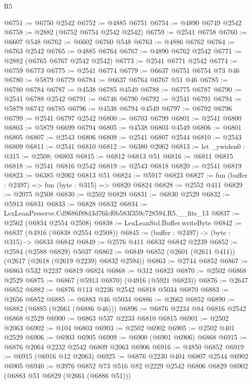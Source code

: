\begin{lexlean}{R5}
\begin{coremodule}
@6751 := @6750 @2542
@6752 := @4885 @6751
@6754 := @4890 @6749 @2542
@6758 := @2882 (@6752 @6754 @2542 @2542)
@6759 := @2541 @6758
@6760 := @6607 @548
@6762 := @6602 @6760 @548
@6763 := @4886 @6762
@6764 := @6763 @2542
@6765 := @4885 @6764
@6767 := @4890 @6762 @2542
@6771 := @2882 (@6765 @6767 @2542 @2542)
@6773 := @2541 @6771 @2542
@6774 := @6759 @6773
@6775 := @2541 @6774
@6779 := @6637 @6751 @6754 @73 @46
@6780 := @5879 @6779
@6784 := @6637 @6764 @6767 @51 @46
@6785 := @6780 @6784
@6787 := @4538 @6785 @4549
@6788 := @6775 @6787
@6790 := @2541 @6788 @2542
@6791 := @6746 @6790
@6792 := @2541 @6791
@6794 := @5879 @6742 @6785
@6796 := @4538 @6794 @4549
@6797 := @6792 @6796
@6799 := @2541 @6797 @2542
@6800 := @6703 @6799
@6801 := @2541 @6800
@6803 := @5879 @6699 @6794
@6805 := @4538 @6803 @4549
@6806 := @6801 @6805
@6807 := @2543 @6806
@6809 := @2541 @6807 @2544
@6810 := @2543 @6809
@6811 := @2541 @6810
@6812 := @6380 @2062
@6813 := let _ywiden0 : @315 := @2508; @6803
@6815 := @6812 @6813 @51
@6816 := @6811 @6815
@6818 := @2541 @6816 @2542
@6819 := @2543 @6818
@6820 := @2541 @6819
@6823 := @6385 @2062 @6813 @51
@6824 := @5917 @6823
@6827 := fun (buffer : @2497) => fun (byte : @315) => @6820 @6824
@6828 := @2552 @411
@6829 := @2075 @2508
@6830 := @2502 @6829
@6831 := @6830 @2529
@6832 := @5913 @6831
@6833 := @6828 @6832
@6834 := LexLeanPreserve.Cd9686f88d3d76fcf0b583f359c728594.R5.__fits_13
@6837 := @2562 (@6834 @2554 @2508)
@6838 := LexLeanStd.Buffer.writeByte
@6842 := @6837 (@4916 (@6838 @2554 @2508))
@6845 := (buffer : @2497) -> (byte : @315) -> @6833 @6842
@6849 := @2576 @411 @6832 @6842 @2239
@6852 := @2584 (@2588 @6829) @5037
@6862 := @6849 @6852 (@2601 (@2611 @411)) (@2617 (@2618 (@2619 @2239) @6832 @2594))
@6863 := @2744 @6852
@6867 := @6863 @532 @2237 @6819 @6824
@6868 := @312 @6823
@6870 := @2502 @6868 @2529
@6875 := @6867 (@5913 @6870) (@4916 (@5921 @6823))
@6876 := @2647 @6852
@6882 := @6876 @113 @2236 @2542 @6818 @5034 @6870
@6883 := @2656 @6852
@6885 := @6883 @46 @5034
@6886 := @2662 @6852
@6890 := @6882 (@6885 (@2661 (@6886 @46)))
@6896 := @6876 @2234 @84 @6816 @2542 @6868 @2529
@6900 := @6863 @537 @2233 @6810 @6815
@6901 := @2502 @2063
@6902 := @104 @6803
@6903 := @2502 @6902
@6905 := @2502 @401 @2529
@6906 := @6903 @6905
@6909 := @6900 (@6901 @6906) @6868
@6915 := @6876 @2064 @2232 @2542 @6809 @2063 @6906
@6916 := @4850 @6852
@6919 := @6915 (@6916 @12 @2063)
@6925 := @6876 @2230 @404 @6807 @2544 @6902 @6905
@6940 := @3976
    @6852
    @73
    @516
    @82
    @2229
    @2542
    @6806
    @6829
    @6902
    (@6883 @51 @6829 (@2661 (@6886 @51)))

\end{coremodule}
\end{lexlean}
